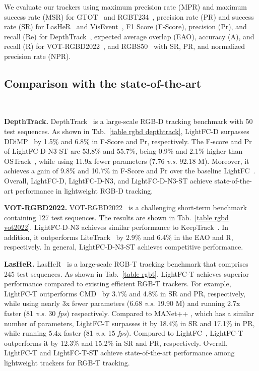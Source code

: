 We evaluate our trackers using maximum precision rate (MPR) and maximum success rate (MSR) for GTOT~\cite{gtot} and RGBT234~\cite{rgbt234}, precision rate (PR) and success rate (SR) for LasHeR~\cite{lasher} and VisEvent~\cite{visevent}, F1 Score (F-Score), precision (Pr), and recall (Re) for DepthTrack~\cite{depthtrack}, expected average overlap (EAO), accuracy (A), and recall (R) for VOT-RGBD2022~\cite{vot22}, and RGBS50~\cite{rgbs50} with SR, PR, and normalized precision rate (NPR).


\subsection{Comparison with the state-of-the-art}

\

\textbf{DepthTrack.} DepthTrack~\cite{depthtrack} is a large-scale RGB-D tracking benchmark with 50 test sequences. 
As shown in Tab.~\ref{table rgbd depthtrack}, LightFC-D surpasses DDiMP~\cite{vot20} by 1.5\% and 6.8\% in F-Score and Pr, respectively. 
The F-score and Pr of LightFC-D-N3-ST are 53.8\% and 55.7\%, being 0.9\% and 2.1\% higher than OSTrack~\cite{ostrack}, while using 11.9x fewer parameters (7.76 \textit{v.s.} 92.18 M). 
Moreover, it achieves a gain of 9.8\% and 10.7\% in F-Score and Pr over the baseline LightFC~\cite{lightfc}. Overall, LightFC-D, LightFC-D-N3, and LightFC-D-N3-ST achieve state-of-the-art performance in lightweight RGB-D tracking. 

\textbf{VOT-RGBD2022.} VOT-RGBD2022~\cite{vot22} is a challenging short-term benchmark containing 127 test sequences. The results are shown in Tab.~\ref{table rgbd vot2022}. LightFC-D-N3 achieves similar performance to KeepTrack~\cite{keeptrack}. In addition, it outperforms LiteTrack~\cite{litetrack} by 2.9\% and 6.4\% in the EAO and R, respectively. In general, LightFC-D-N3-ST achieves competitive performance.




\textbf{LasHeR.} LasHeR~\cite{lasher} is a large-scale RGB-T tracking benchmark that comprises 245 test sequences. As shown in Tab.~\ref{table rgbt}. LightFC-T achieves superior performance compared to existing efficient RGB-T trackers. For example, LightFC-T outperforms CMD~\cite{cmd} by 3.7\% and 4.8\% in SR and PR, respectively, while using nearly 3x fewer parameters (6.68 \textit{v.s.} 19.90 M) and running 2.7x faster (81 \textit{v.s.} 30 \textit{fps}) respectively. Compared to MANet++ \cite{manetpp}, which has a similar number of parameters, LightFC-T surpasses it by 18.4\% in SR and 17.1\% in PR, while running 5.4x faster (81 \textit{v.s. }15 \textit{fps}). Compared to LightFC~\cite{lightfc}, LightFC-T outperforms it by 12.3\% and 15.2\% in SR and PR, respectively. Overall, LightFC-T and LightFC-T-ST achieve state-of-the-art performance among lightweight trackers for RGB-T tracking. 

